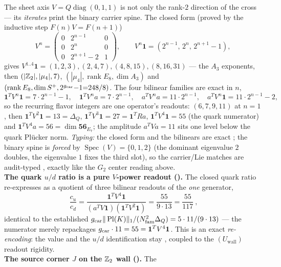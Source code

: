 
\begin{keybox}
The sheet axis $V=Q\operatorname{diag}(0,1,1)$ is not only the rank-$2$ direction of the cross --- its
\emph{iterates} print the binary carrier spine. The closed form (proved by the inductive step
$F(n)V=F(n{+}1)$)
\[
  V^n=\begin{pmatrix}0&2^{n-1}&0\\0&2^{n}&0\\0&2^{n+1}-2&1\end{pmatrix},\qquad
  V^n\mathbf 1=(2^{n-1},\,2^{n},\,2^{n+1}-1),
\]
gives $V^{1..4}\mathbf 1=(1,2,3),(2,4,7),(4,8,15),(8,16,31)$ --- the $A_3$ exponents, then
$(|\mathbb{Z}_2|,|\mu_4|,7)$, $(|\mu_4|,\operatorname{rank}E_8,\dim A_3)$ and
$(\operatorname{rank}E_8,\dim S^+,2^{g_{\mathrm{car}}}{-}1{=}248/8)$. The four bilinear families are exact in $n$,
\[
  \mathbf 1^TV^n\mathbf 1=7\cdot2^{n-1}-1,\quad \mathbf 1^TV^na=7\cdot2^{n-1},\quad
  a^TV^na=11\cdot2^{n-1},\quad a^TV^n\mathbf 1=11\cdot2^{n-1}-2,
\]
so the recurring flavor integers are one operator's readouts: $(6,7,9,11)$ at $n{=}1$, then
$\mathbf 1^TV^2\mathbf 1=13=\Delta_Q$, $\mathbf 1^TV^3\mathbf 1=27=\mathbf 1^TRa$,
$\mathbf 1^TV^4\mathbf 1=55$ (the quark numerator) and $\mathbf 1^TV^4a=56=\dim\mathbf{56}_{E_7}$; the
amplitude $a^TVa=11$ sits one level below the quark Pl\"ucker norm. \emph{Typing:} the closed form and
the bilinears are exact \mE; the binary spine is \emph{forced} by $\operatorname{Spec}(V)=\{0,1,2\}$ (the
dominant eigenvalue $2$ doubles, the eigenvalue $1$ fixes the third slot), so the carrier/Lie matches are
audit-typed \mC, exactly like the $G_2$ center reading above.
\smallskip\\
\noindent\textbf{The quark $u/d$ ratio is a pure $V$-power readout ().}
The closed quark ratio re-expresses as a quotient of three bilinear readouts of the \emph{one} generator,
\[
  \boxed{\ \frac{c_u}{c_d}=\frac{\mathbf 1^TV^4\mathbf 1}{(a^TV\mathbf 1)(\mathbf 1^TV^2\mathbf 1)}
  =\frac{55}{9\cdot13}=\frac{55}{117}\ },
\]
identical to the established $g_{\mathrm{car}}\|\operatorname{Pl}(K)\|_1/(N_{\mathrm{fam}}^2\Delta_Q)=5\cdot11/(9\cdot13)$ --- the
numerator merely repackages $g_{\mathrm{car}}\cdot11=55=\mathbf 1^TV^4\mathbf 1$. This is an exact \emph{re-encoding}:
the value and the $u/d$ identification stay \mC, coupled to the $(U_{\mathrm{wall}})$ readout rigidity.
\smallskip\\
\noindent\textbf{The source corner $J$ on the $\mathbb{Z}_2$ wall ().} The

\end{keybox}
